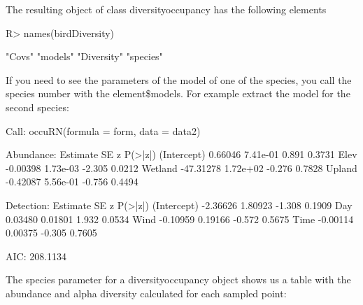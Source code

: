\documentclass[article]{jss}
\begin{document}
The resulting object of class diversityoccupancy has the following
elements

\begin{CodeChunk}

\begin{CodeInput}
R> names(birdDiversity)
\end{CodeInput}

\begin{CodeOutput}
[1] "Covs"      "models"    "Diversity" "species"  
\end{CodeOutput}
\end{CodeChunk}

If you need to see the parameters of the model of one of the species,
you call the species number with the element\$models. For example
extract the model for the second species:

\begin{CodeChunk}


\begin{CodeOutput}

Call:
occuRN(formula = form, data = data2)

Abundance:
             Estimate       SE      z P(>|z|)
(Intercept)   0.66046 7.41e-01  0.891  0.3731
Elev         -0.00398 1.73e-03 -2.305  0.0212
Wetland     -47.31278 1.72e+02 -0.276  0.7828
Upland       -0.42087 5.56e-01 -0.756  0.4494

Detection:
            Estimate      SE      z P(>|z|)
(Intercept) -2.36626 1.80923 -1.308  0.1909
Day          0.03480 0.01801  1.932  0.0534
Wind        -0.10959 0.19166 -0.572  0.5675
Time        -0.00114 0.00375 -0.305  0.7605

AIC: 208.1134 
\end{CodeOutput}
\end{CodeChunk}

The species parameter for a diversityoccupancy object shows us a table with the abundance and alpha diversity calculated for each sampled point:
\end{document}
